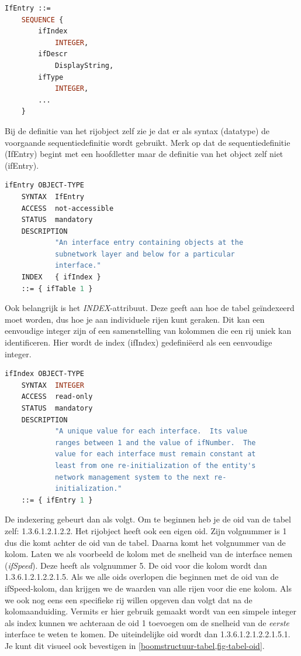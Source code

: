 \begin{lstlisting}[language=asn.1, float=h, caption={Sequentiedefinitie van een tabelrij}, label=definitie-sequentie-rij]
IfEntry ::=
	SEQUENCE {
		ifIndex
			INTEGER,
		ifDescr
			DisplayString,
		ifType
			INTEGER,
		...
	}
\end{lstlisting}

Bij de definitie van het rijobject zelf zie je dat er als syntax (datatype) de voorgaande sequentiedefinitie wordt gebruikt.
Merk op dat de sequentiedefinitie (IfEntry) begint met een hoofdletter maar de definitie van het object zelf niet (ifEntry).

\begin{lstlisting}[language=asn.1, float=h, caption={Definitie van een rijobject}, label=definitie-rijobject]
ifEntry OBJECT-TYPE
	SYNTAX	IfEntry
	ACCESS	not-accessible
	STATUS	mandatory
	DESCRIPTION
			"An interface entry containing objects at the
			subnetwork layer and below for a particular
			interface."
	INDEX	{ ifIndex }
	::= { ifTable 1 }
\end{lstlisting}

Ook belangrijk is het \textit{INDEX}-attribuut. Deze geeft aan hoe de tabel geïndexeerd moet worden, dus hoe je aan individuele rijen kunt geraken.
Dit kan een eenvoudige integer zijn of een samenstelling van kolommen die een rij uniek kan identificeren.
Hier wordt de index (ifIndex) gedefiniëerd als een eenvoudige integer.

\begin{lstlisting}[language=asn.1, float=h, caption={Definitie van een index}, label=definitie-ifindex]
ifIndex OBJECT-TYPE
	SYNTAX	INTEGER
	ACCESS	read-only
	STATUS	mandatory
	DESCRIPTION
			"A unique value for each interface.  Its value
			ranges between 1 and the value of ifNumber.  The
			value for each interface must remain constant at
			least from one re-initialization of the entity's
			network management system to the next re-
			initialization."
	::= { ifEntry 1 }
\end{lstlisting}

De indexering gebeurt dan als volgt. Om te beginnen heb je de \gls{oid} van de tabel zelf: 1.3.6.1.2.1.2.2.
Het rijobject heeft ook een eigen \gls{oid}. Zijn volgnummer is 1 dus die komt achter de \gls{oid} van de tabel.
Daarna komt het volgnummer van de kolom. Laten we als voorbeeld de kolom met de snelheid van de interface nemen (\textit{ifSpeed}).
Deze heeft als volgnummer 5. De \gls{oid} voor die kolom wordt dan 1.3.6.1.2.1.2.2.1.5.
Als we alle \glspl{oid} overlopen die beginnen met de \gls{oid} van de ifSpeed-kolom, dan krijgen we de waarden van alle rijen voor die ene kolom.
Als we ook nog eens een specifieke rij willen opgeven dan volgt dat na de kolomaanduiding.
Vermits er hier gebruik gemaakt wordt van een simpele integer als index kunnen we achteraan de \gls{oid} 1 toevoegen om 
de snelheid van de \emph{eerste} interface te weten te komen. De uiteindelijke \gls{oid} wordt dan 1.3.6.1.2.1.2.2.1.5.1.
Je kunt dit visueel ook bevestigen in \cref{boomstructuur-tabel,fig-tabel-oid}.

